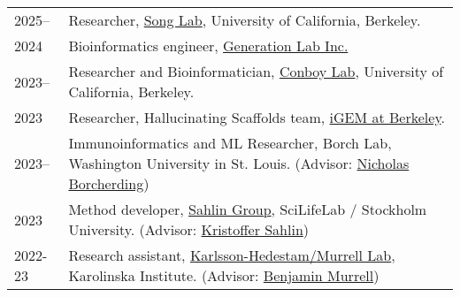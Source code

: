 
\begin{longtable}[l]{@{}p{} p{}}

    2025-- & Researcher, \href{https://people.eecs.berkeley.edu/~yss/}{Song Lab}, University of California, Berkeley. \\

    2024 & Bioinformatics engineer, \href{https://www.generationlab.com/}{Generation Lab Inc.} \\

    2023-- & Researcher and Bioinformatician, \href{https://conboylab.berkeley.edu/}{Conboy Lab}, University of California, Berkeley. \\

    2023 & Researcher, Hallucinating Scaffolds team, \href{https://igem.studentorg.berkeley.edu/teams/hallucinating-scaffolds/}{iGEM at Berkeley}. \\

    2023-- & Immunoinformatics and ML Researcher, Borch Lab, Washington University in St. Louis. (Advisor: \href{https://www.borch.dev/}{Nicholas Borcherding}) \\

    2023 & Method developer, \href{https://sahlingroup.github.io/}{Sahlin Group}, SciLifeLab / Stockholm University. (Advisor: \href{https://www.scilifelab.se/researchers/kristoffer-sahlin/}{Kristoffer Sahlin}) \\

    2022-23 & Research assistant, \href{https://ki.se/en/people/benjamin-murrell}{Karlsson-Hedestam/Murrell Lab}, Karolinska Institute. (Advisor: \href{https://ki.se/en/people/benjamin-murrell}{Benjamin Murrell}) \\

\end{longtable}

